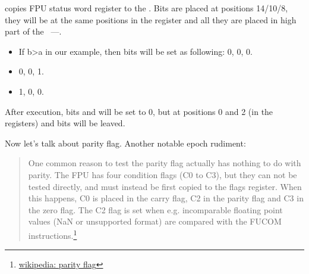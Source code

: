 {\FNSTSW copies FPU status word register to the \AX. Bits \CThreeBits are placed at positions 14/10/8, 
they will be at the same positions in the \AX register and all they are placed in high part of the \AX{}~---\AH{}.}

\begin{itemize}
\item
{}
{If b>a in our example, then \CThreeBits bits will be set as following:} 0, 0, 0.
\item
{} 0, 0, 1.
\item
{} 1, 0, 0.
\end{itemize}

{After  execution, bits \Cthree and  will be set to 0, 
but at positions 0 and 2 (in the \AH registers) 
\Czero and \Ctwo bits will be leaved.}

\label{parity_flag}
{Now let's talk about parity flag. Another notable epoch rudiment}:

\begin{framed}
\begin{quotation}
One common reason to test the parity flag actually has nothing to do with parity. The FPU has four condition flags 
(C0 to C3), but they can not be tested directly, and must instead be first copied to the flags register. 
When this happens, C0 is placed in the carry flag, C2 in the parity flag and C3 in the zero flag. 
The C2 flag is set when e.g. incomparable floating point values (NaN or unsupported format) are compared 
with the FUCOM instructions.\footnote{\href{http://en.wikipedia.org/wiki/Parity_flag}{wikipedia: parity flag}}
\end{quotation}
\end{framed}

